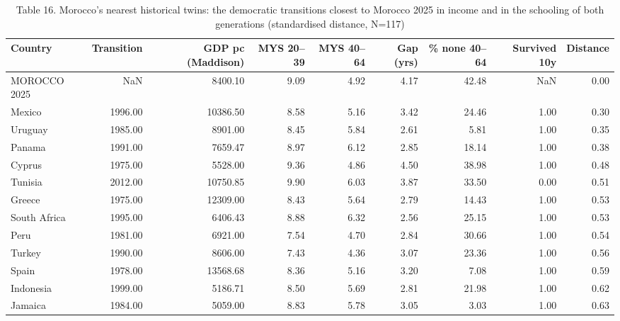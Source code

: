 \begin{table}
\caption{Table 16. Morocco's nearest historical twins: the democratic transitions closest to Morocco 2025 in income and in the schooling of both generations (standardised distance, N=117)}
\label{tab:T16_historical_twins}
\begin{tabular}{lrrrrrrrr}
\toprule
Country & Transition & GDP pc (Maddison) & MYS 20–39 & MYS 40–64 & Gap (yrs) & \% none 40–64 & Survived 10y & Distance \\
\midrule
MOROCCO 2025 & NaN & 8400.10 & 9.09 & 4.92 & 4.17 & 42.48 & NaN & 0.00 \\
Mexico & 1996.00 & 10386.50 & 8.58 & 5.16 & 3.42 & 24.46 & 1.00 & 0.30 \\
Uruguay & 1985.00 & 8901.00 & 8.45 & 5.84 & 2.61 & 5.81 & 1.00 & 0.35 \\
Panama & 1991.00 & 7659.47 & 8.97 & 6.12 & 2.85 & 18.14 & 1.00 & 0.38 \\
Cyprus & 1975.00 & 5528.00 & 9.36 & 4.86 & 4.50 & 38.98 & 1.00 & 0.48 \\
Tunisia & 2012.00 & 10750.85 & 9.90 & 6.03 & 3.87 & 33.50 & 0.00 & 0.51 \\
Greece & 1975.00 & 12309.00 & 8.43 & 5.64 & 2.79 & 14.43 & 1.00 & 0.53 \\
South Africa & 1995.00 & 6406.43 & 8.88 & 6.32 & 2.56 & 25.15 & 1.00 & 0.53 \\
Peru & 1981.00 & 6921.00 & 7.54 & 4.70 & 2.84 & 30.66 & 1.00 & 0.54 \\
Turkey & 1990.00 & 8606.00 & 7.43 & 4.36 & 3.07 & 23.36 & 1.00 & 0.56 \\
Spain & 1978.00 & 13568.68 & 8.36 & 5.16 & 3.20 & 7.08 & 1.00 & 0.59 \\
Indonesia & 1999.00 & 5186.71 & 8.50 & 5.69 & 2.81 & 21.98 & 1.00 & 0.62 \\
Jamaica & 1984.00 & 5059.00 & 8.83 & 5.78 & 3.05 & 3.03 & 1.00 & 0.63 \\
\bottomrule
\end{tabular}
\end{table}
